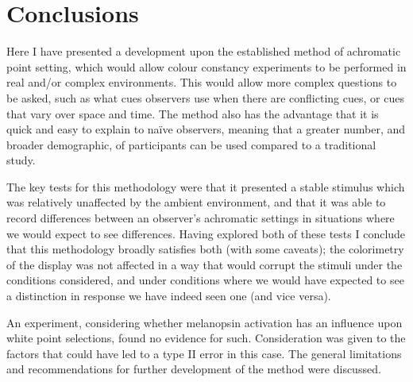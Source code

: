 \section{Conclusions}

Here I have presented a development upon the established method of achromatic point setting, which would allow colour constancy experiments to be performed in real and/or complex environments. This would allow more complex questions to be asked, such as what cues observers use when there are conflicting cues, or cues that vary over space and time.
The method also has the advantage that it is quick and easy to explain to naïve observers, meaning that a greater number, and broader demographic, of participants can be used compared to a traditional study.

The key tests for this methodology were that it presented a stable stimulus which was relatively unaffected by the ambient environment, and that it was able to record differences between an observer's achromatic settings in situations where we would expect to see differences. Having explored both of these tests I conclude that this methodology broadly satisfies both (with some caveats); the colorimetry of the display was not affected in a way that would corrupt the stimuli under the conditions considered, and under conditions where we would have expected to see a distinction in response we have indeed seen one (and vice versa).

An experiment, considering whether melanopsin activation has an influence upon white point selections, found no evidence for such. Consideration was given to the factors that could have led to a type II error in this case.
The general limitations and recommendations for further development of the method were discussed.




